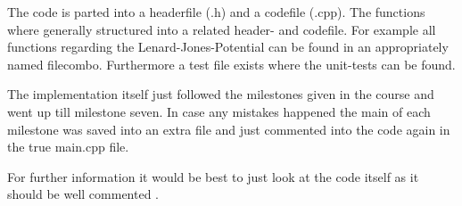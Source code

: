 The code is parted into a headerfile (.h) and a codefile (.cpp). The functions where generally structured into a related header- and codefile. For example all functions regarding the Lenard-Jones-Potential can be found in an appropriately named filecombo. Furthermore a test file exists where the unit-tests can be found.
\par
The implementation itself just followed the milestones given in the course and went up till milestone seven. 
In case any mistakes happened the main of each milestone was saved into an extra file and just commented into the code again in the true main.cpp file. 
\par
For further information it would be best to just look at the code itself as it should be well commented \cite{molDymGithub}.





